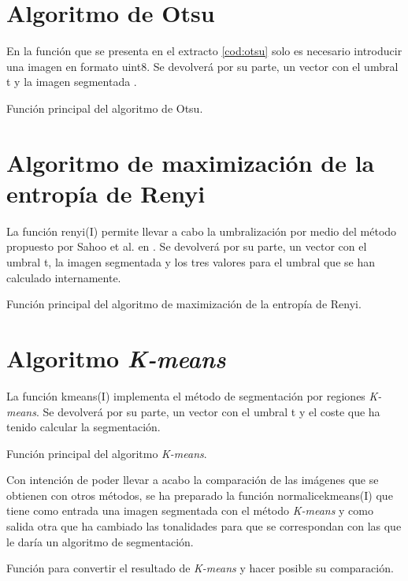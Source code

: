 \section{Algoritmo de Otsu}
En la función que se presenta en el extracto \ref{cod:otsu} solo es necesario introducir una imagen en formato {\ttfamily uint8}. Se devolverá por su parte, un vector con el umbral {\ttfamily t} y la imagen segmentada \cite{art:otsu}.
\begin{listing}
    \caption{Función principal del algoritmo de Otsu.\label{cod:otsu}}
\end{listing}


\section{Algoritmo de maximización de la entropía de Renyi}
La función {\ttfamily renyi(I)} permite llevar a cabo la umbralización por medio del método propuesto por Sahoo et al. en \cite{art:sahoo}. Se devolverá por su parte, un vector con el umbral {\ttfamily t}, la imagen segmentada y los tres valores para el umbral que se han calculado internamente.
\begin{listing}
    \caption{Función principal del algoritmo de maximización de la entropía de Renyi.\label{cod:renyi}}
\end{listing}


\section{Algoritmo {\em K-means}}
La función {\ttfamily kmeans(I)} implementa el método de segmentación por regiones {\em K-means}. Se devolverá por su parte, un vector con el umbral {\ttfamily t} y el coste que ha tenido calcular la segmentación.
\begin{listing}
    \caption{Función principal del algoritmo {\em K-means}.\label{cod:kmeans}}
\end{listing}

Con intención de poder llevar a acabo la comparación de las imágenes que se obtienen con otros métodos, se ha preparado la función {\ttfamily normalicekmeans(I)} que tiene como entrada una imagen segmentada con el método {\em K-means} y como salida otra que ha cambiado las tonalidades para que se correspondan con las que le daría un algoritmo de segmentación.
\begin{listing}
    \caption{Función para convertir el resultado de {\em K-means} y hacer posible su comparación.\label{cod:kmeansnormalice}}
\end{listing}
